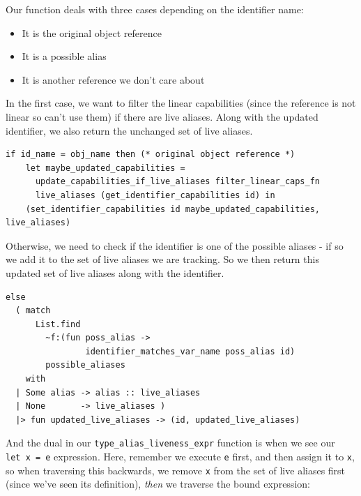 Our function deals with three cases depending on the identifier name:

\begin{itemize}
\tightlist
\item
  It is the original object reference
\item
  It is a possible alias
\item
  It is another reference we don't care about
\end{itemize}

In the first case, we want to filter the linear capabilities (since the
reference is not linear so can't use them) if there are live aliases.
Along with the updated identifier, we also return the unchanged set of
live aliases.

\begin{lstlisting}[caption={type\_alias\_liveness.ml},language=caml]
if id_name = obj_name then (* original object reference *)
    let maybe_updated_capabilities =
      update_capabilities_if_live_aliases filter_linear_caps_fn
      live_aliases (get_identifier_capabilities id) in
    (set_identifier_capabilities id maybe_updated_capabilities, live_aliases)
\end{lstlisting}


Otherwise, we need to check if the identifier is one of the possible
aliases - if so we add it to the set of live aliases we are tracking. So
we then return this updated set of live aliases along with the
identifier.

%


\begin{lstlisting}[language=caml]
else
  ( match
      List.find
        ~f:(fun poss_alias ->
                identifier_matches_var_name poss_alias id)
        possible_aliases
    with
  | Some alias -> alias :: live_aliases
  | None       -> live_aliases )
  |> fun updated_live_aliases -> (id, updated_live_aliases)
\end{lstlisting}

And the dual in our \texttt{type\_alias\_liveness\_expr} function is
when we see our \texttt{let\ x\ =\ e} expression. Here, remember we
execute \texttt{e} first, and then assign it to \texttt{x}, so when
traversing this backwards, we remove \texttt{x} from the set of live
aliases first (since we've seen its definition), \emph{then} we traverse
the bound expression:

